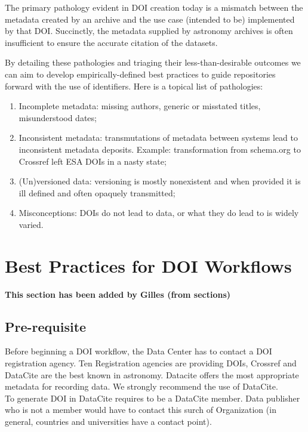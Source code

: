 \documentclass[11pt,a4paper]{ivoa}
\begin{document}
The primary pathology evident in DOI creation today is a mismatch between the metadata created by an archive and the use case (intended to be) implemented by that DOI. 
Succinctly, the metadata supplied by astronomy archives is often insufficient to ensure the accurate citation of the datasets.

By detailing these pathologies and triaging their less-than-desirable outcomes we can aim to develop empirically-defined best practices to guide repositories forward with the use of identifiers.
Here is a topical list of pathologies:

\begin{enumerate}
	\item Incomplete metadata: missing authors, generic or misstated titles, misunderstood dates;
	\item Inconsistent metadata: transmutations of metadata between systems lead to inconsistent metadata deposits. Example: transformation from schema.org to Crossref left ESA DOIs in a nasty state;
	\item (Un)versioned data: versioning is mostly nonexistent and when provided it is ill defined and often opaquely transmitted;
	\item Misconceptions: DOIs do not lead to data, or what they do lead to is widely varied.
\end{enumerate}



\section{Best Practices for DOI Workﬂows}
\textbf{\color{red}This section has been added by Gilles (from sections)}

\subsection{Pre-requisite}

Before beginning a DOI workflow, the Data Center has to contact a DOI registration agency.
Ten Registration agencies are providing DOIs, Crossref and DataCite are the best known in astronomy. 
Datacite offers the most appropriate metadata for recording data. We strongly recommend the use of DataCite.\\

To generate DOI in DataCite requires to be a DataCite member. Data publisher who is not a member would have to contact this surch of Organization (in general, countries and universities have a contact point).
\end{document}
